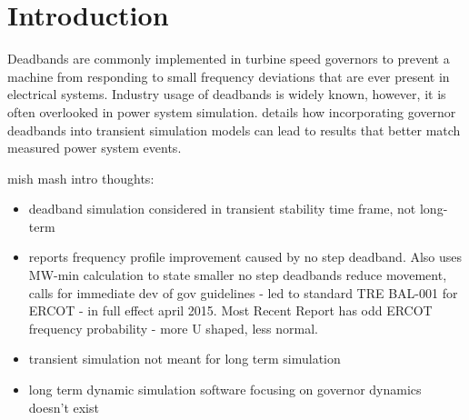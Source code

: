 \section{Introduction}
Deadbands are commonly implemented in turbine speed governors to prevent a machine from responding to small frequency deviations that are ever present in electrical systems.
Industry usage of deadbands is widely known, however, it is often overlooked in power system simulation.
\cite{kou2016} details how incorporating governor deadbands into transient simulation models can lead to results that better match measured power system events.


mish mash intro thoughts:
\begin{itemize}
	\item deadband simulation considered in transient stability time frame, not long-term
	\item \cite{nercFRI2012} reports frequency profile improvement caused by no step deadband. Also uses MW-min calculation to state smaller no step deadbands reduce movement, calls for immediate dev of gov guidelines - led to standard TRE BAL-001 for ERCOT - in full effect april 2015. Most Recent Report \cite{nercFRAA2018} has odd ERCOT frequency probability - more U shaped, less normal.
	\item transient simulation not meant for long term simulation
	\item long term dynamic simulation software focusing on governor dynamics doesn't exist
\end{itemize}


